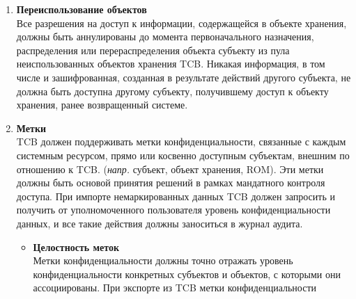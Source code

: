 \begin{enumerate}
\begin{enumerate}
\begin{enumerate}
\begin{enumerate}
                (\textit{напр.} ACL) должны позволять пользователям определять и контролировать общий доступ к объектам именованными субъектами и/или определенной группой субъектов и обеспечивать
                контроль ограничения распространения прав доступа. Механизм дискреционного контроля доступа должен либо путем явного действия пользователя, либо по умолчанию обеспечивать защиту
                объектов от несанкционированного доступа. Средства управления доступом должны позволять определять для каждого именованного объекта список именованных субъектов и список групп
                именованных субъектов с их соответствующими режимами доступа к этому объекту. Кроме того, для каждого такого именованного объекта должна быть возможность указать список
                именованных субъектов и список групп именованных субъектов, для которых доступ к объекту не должен быть предоставлен. Право на доступ к объекту пользователям, не имеющим
                данного права, должно назначаться только авторизованным пользователем.
                \item{\textbf{Переиспользование объектов}}\\
                Все разрешения на доступ к информации, содержащейся в объекте хранения, должны быть аннулированы до момента первоначального назначения, распределения или перераспределения объекта
                субъекту из пула неиспользованных объектов хранения TCB. Никакая информация, в том числе и зашифрованная, созданная в результате действий другого субъекта, не должна быть доступна
                другому субъекту, получившему доступ к объекту хранения, ранее возвращенный системе.
                \item{\textbf{Метки}}\\
                TCB должен поддерживать метки конфиденциальности, связанные с каждым системным ресурсом, прямо или косвенно доступным субъектам, внешним по отношению к TCB. (\textit{напр.} субъект,
                объект хранения, ROM). Эти метки должны быть основой принятия решений в рамках мандатного контроля доступа. При импорте немаркированных данных TCB должен запросить и получить от
                уполномоченного пользователя уровень конфиденциальности данных, и все такие действия должны заноситься в журнал аудита.
                \begin{itemize}
                    \item{\textbf{Целостность меток}}\\
                    Метки конфиденциальности должны точно отражать уровень конфиденциальности конкретных субъектов и объектов, с которыми они ассоциированы. При экспорте из TCB метки конфиденциальности

\end{itemize}
\end{enumerate}
\end{enumerate}
\end{enumerate}
\end{enumerate}
